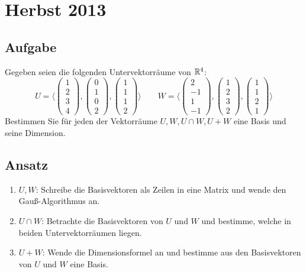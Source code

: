 \newpage

\section{Herbst 2013}

\subsection{Aufgabe}
Gegeben seien die folgenden Untervektorräume von \( \mathbb{R}^4 \):
\begin{equation*}
	U = \langle \begin{pmatrix}
		1 \\ 2 \\ 3 \\ 4
	\end{pmatrix}, \begin{pmatrix}
		0 \\ 1 \\ 0 \\ 2
	\end{pmatrix}, \begin{pmatrix}
		1 \\ 1 \\ 1 \\ 2
	\end{pmatrix} \rangle \qquad W = \langle \begin{pmatrix}
		2 \\ -1 \\ 1 \\ -1
	\end{pmatrix}, \begin{pmatrix}
		1 \\ 2 \\ 3 \\ 2
	\end{pmatrix}, \begin{pmatrix}
		1 \\ 1 \\ 2 \\ 1
	\end{pmatrix} \rangle
\end{equation*}
Bestimmen Sie für jeden der Vektorräume \( U, W, U \cap W, U + W \) eine Basis und seine Dimension.

\subsection{Ansatz}
\begin{enumerate}
	\item \( U, W \): Schreibe die Basisvektoren als Zeilen in eine Matrix und wende den Gauß-Algorithmus an.
	\item \( U \cap W \): Betrachte die Basisvektoren von \( U \) und \( W \) und bestimme, welche in beiden Untervektorräumen liegen.
	\item \( U + W \): Wende die Dimensionsformel an und bestimme aus den Basisvektoren von \( U \) und \( W \) eine Basis. 
\end{enumerate}

